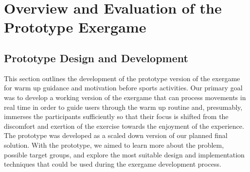 \chapter{Overview and Evaluation of the Prototype Exergame}\label{chapter:survey}
\section{Prototype Design and Development}
This section outlines the development of the prototype version of the exergame for warm up guidance and motivation before sports activities. Our primary goal was to develop a working version of the exergame that can process movements in real time in order to guide users through the warm up routine and, presumably, immerses the participants sufficiently so that their focus is shifted from the discomfort and exertion of the exercise towards the enjoyment of the experience. The prototype was developed as a scaled down version of our planned final solution. With the prototype, we aimed to learn more about the problem, possible target groups, and explore the most suitable design and implementation techniques that could be used during the exergame development process. 
